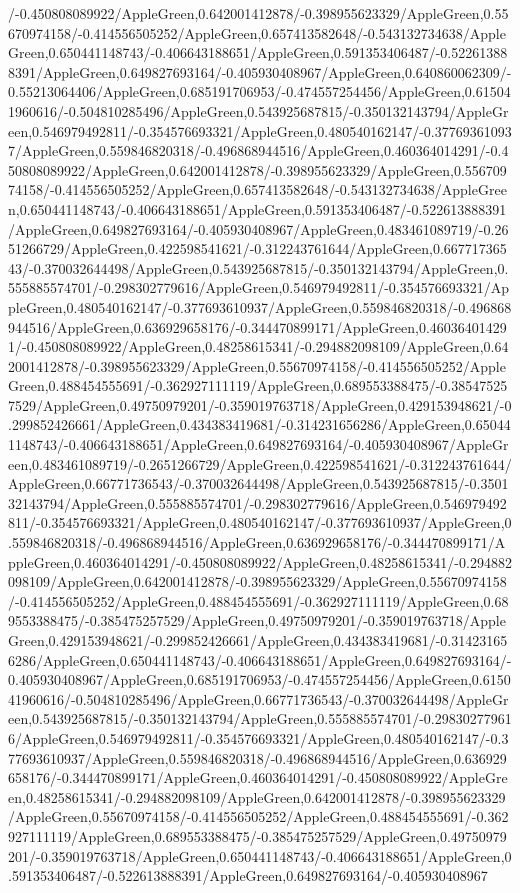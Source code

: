 {\begin{tikzternal}
{/-0.450808089922/AppleGreen,0.642001412878/-0.398955623329/AppleGreen,0.55670974158/-0.414556505252/AppleGreen,0.657413582648/-0.543132734638/AppleGreen,0.650441148743/-0.406643188651/AppleGreen,0.591353406487/-0.522613888391/AppleGreen,0.649827693164/-0.405930408967/AppleGreen,0.640860062309/-0.55213064406/AppleGreen,0.685191706953/-0.474557254456/AppleGreen,0.615041960616/-0.504810285496/AppleGreen,0.543925687815/-0.350132143794/AppleGreen,0.546979492811/-0.354576693321/AppleGreen,0.480540162147/-0.377693610937/AppleGreen,0.559846820318/-0.496868944516/AppleGreen,0.460364014291/-0.450808089922/AppleGreen,0.642001412878/-0.398955623329/AppleGreen,0.55670974158/-0.414556505252/AppleGreen,0.657413582648/-0.543132734638/AppleGreen,0.650441148743/-0.406643188651/AppleGreen,0.591353406487/-0.522613888391/AppleGreen,0.649827693164/-0.405930408967/AppleGreen,0.483461089719/-0.2651266729/AppleGreen,0.422598541621/-0.312243761644/AppleGreen,0.66771736543/-0.370032644498/AppleGreen,0.543925687815/-0.350132143794/AppleGreen,0.555885574701/-0.298302779616/AppleGreen,0.546979492811/-0.354576693321/AppleGreen,0.480540162147/-0.377693610937/AppleGreen,0.559846820318/-0.496868944516/AppleGreen,0.636929658176/-0.344470899171/AppleGreen,0.460364014291/-0.450808089922/AppleGreen,0.48258615341/-0.294882098109/AppleGreen,0.642001412878/-0.398955623329/AppleGreen,0.55670974158/-0.414556505252/AppleGreen,0.488454555691/-0.362927111119/AppleGreen,0.689553388475/-0.385475257529/AppleGreen,0.49750979201/-0.359019763718/AppleGreen,0.429153948621/-0.299852426661/AppleGreen,0.434383419681/-0.314231656286/AppleGreen,0.650441148743/-0.406643188651/AppleGreen,0.649827693164/-0.405930408967/AppleGreen,0.483461089719/-0.2651266729/AppleGreen,0.422598541621/-0.312243761644/AppleGreen,0.66771736543/-0.370032644498/AppleGreen,0.543925687815/-0.350132143794/AppleGreen,0.555885574701/-0.298302779616/AppleGreen,0.546979492811/-0.354576693321/AppleGreen,0.480540162147/-0.377693610937/AppleGreen,0.559846820318/-0.496868944516/AppleGreen,0.636929658176/-0.344470899171/AppleGreen,0.460364014291/-0.450808089922/AppleGreen,0.48258615341/-0.294882098109/AppleGreen,0.642001412878/-0.398955623329/AppleGreen,0.55670974158/-0.414556505252/AppleGreen,0.488454555691/-0.362927111119/AppleGreen,0.689553388475/-0.385475257529/AppleGreen,0.49750979201/-0.359019763718/AppleGreen,0.429153948621/-0.299852426661/AppleGreen,0.434383419681/-0.314231656286/AppleGreen,0.650441148743/-0.406643188651/AppleGreen,0.649827693164/-0.405930408967/AppleGreen,0.685191706953/-0.474557254456/AppleGreen,0.615041960616/-0.504810285496/AppleGreen,0.66771736543/-0.370032644498/AppleGreen,0.543925687815/-0.350132143794/AppleGreen,0.555885574701/-0.298302779616/AppleGreen,0.546979492811/-0.354576693321/AppleGreen,0.480540162147/-0.377693610937/AppleGreen,0.559846820318/-0.496868944516/AppleGreen,0.636929658176/-0.344470899171/AppleGreen,0.460364014291/-0.450808089922/AppleGreen,0.48258615341/-0.294882098109/AppleGreen,0.642001412878/-0.398955623329/AppleGreen,0.55670974158/-0.414556505252/AppleGreen,0.488454555691/-0.362927111119/AppleGreen,0.689553388475/-0.385475257529/AppleGreen,0.49750979201/-0.359019763718/AppleGreen,0.650441148743/-0.406643188651/AppleGreen,0.591353406487/-0.522613888391/AppleGreen,0.649827693164/-0.405930408967}
\end{tikzternal}}
